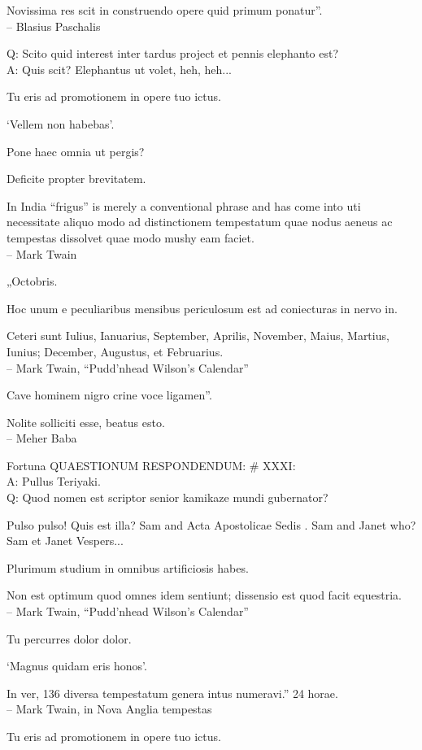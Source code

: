 \documentclass[titlepage,12pt]{memoir}
\begin{document}
Novissima res scit in construendo opere quid primum ponatur”.
\\-- Blasius Paschalis

Q: Scito quid interest inter tardus project
et pennis elephanto est?\\
A: Quis scit? Elephantus ut volet, heh, heh...

Tu eris ad promotionem in opere tuo ictus.

‘Vellem non habebas’.

Pone haec omnia ut pergis?

Deficite propter brevitatem.

In India “frigus” is merely a conventional phrase and has come into
uti necessitate aliquo modo ad distinctionem tempestatum
quae nodus aeneus ac tempestas dissolvet quae modo mushy eam faciet.
\\-- Mark Twain

„Octobris.

Hoc unum e peculiaribus mensibus periculosum est ad coniecturas in nervo in.

Ceteri sunt Iulius, Ianuarius, September, Aprilis, November, Maius, Martius, Iunius;
December, Augustus, et Februarius.
\\-- Mark Twain, “Pudd’nhead Wilson’s Calendar”

Cave hominem nigro crine voce ligamen”.

Nolite solliciti esse, beatus esto.
\\-- Meher Baba

Fortuna QUAESTIONUM RESPONDENDUM: \# XXXI:\\
A: Pullus Teriyaki.
\\Q: Quod nomen est scriptor senior kamikaze mundi gubernator?

Pulso pulso!
Quis est illa?
Sam and Acta Apostolicae Sedis .
Sam and Janet who?
Sam et Janet Vespers...

Plurimum studium in omnibus artificiosis habes.

Non est optimum quod omnes idem sentiunt; dissensio est
quod facit equestria.
\\-- Mark Twain, “Pudd’nhead Wilson’s Calendar”

Tu percurres dolor dolor.

‘Magnus quidam eris honos’.

In ver, 136 diversa tempestatum genera intus numeravi.”
24 horae.
\\-- Mark Twain, in Nova Anglia tempestas

Tu eris ad promotionem in opere tuo ictus.
\end{document}
